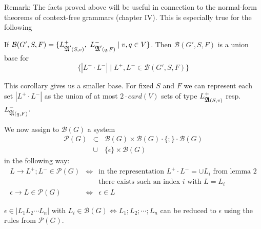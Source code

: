 Remark: The facts proved above will be useful in connection to the normal-form
theorems of context-free grammars (chapter IV). This is especially true for the
following

\begin{corollary}
If $\mathcal{B}(G', S, F) = \{ L^+_{\mbox{$\mathfrak{A'}$}(S, v)},\ L^-_{\mbox{$\mathfrak{A'}$}(q, F)} \mid
v, q \in V \}$. Then $\mathcal{B}(G', S, F)$ is a union base for
\[ \{ |L^+ \cdot L^-| \mid L^+, L^- \in \mathcal{B}(G', S, F) \} \]
\end{corollary}

This corollary gives us a smaller base. For fixed $S$ and $F$ we can represent
each set $|L^+ \cdot L^-|$ as the union of at most $2 \cdot card(V)$ sets of
type $L^+_{\mbox{$\mathfrak{A}$}(S, v)}$ resp.\ $L^-_{\mbox{$\mathfrak{A}$}(q, F)}$.

We now assign to $\mathcal{B}(G)$ a system 
\begin{eqnarray*} 
\mathcal{P}(G) & \subset & \mathcal{B}(G) \times \mathcal{B}(G)
\cdot \{;\} \cdot \mathcal{B}(G) \\
& \cup & \{ \epsilon \} \times \mathcal{B}(G)
\end{eqnarray*}
in the following way:
\begin{eqnarray*}
L \to L^+ ; L^- \in \mathcal{P}(G) & \iff & \text{in the representation } L^+
  \cdot L^- = \cup L_i \text{ from lemma 2} \\
  & & \text {there exists such an index $i$ with $L = L_i$} \\
\epsilon \to L \in \mathcal{P}(G) & \iff & \epsilon \in L
\end{eqnarray*}

\begin{lemma}
$\epsilon \in |L_1 L_2 \cdots L_n|$ with $L_i \in \mathcal{B}(G) \iff
L_1;L_2;\cdots ;L_n$ can be reduced to $\epsilon$ using the rules from
$\mathcal{P}(G)$.
\end{lemma}

